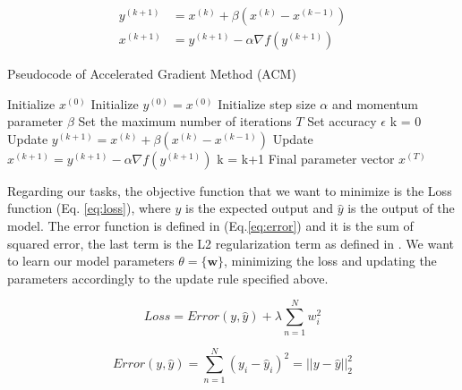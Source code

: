 \begin{equation}
\label{eq:updateruleacm}
\begin{aligned}
y^{(k+1)} &= x^{(k)} + \beta (x^{(k)} - x^{(k-1)}) \\
x^{(k+1)} &= y^{(k+1)} -\alpha \nabla f(y^{(k+1)})    
\end{aligned}
\end{equation}



\begin{algorithm}
    \caption{Pseudocode of Accelerated Gradient Method (ACM)}
    \label{alg:ACG}
    \begin{algorithmic}[1]
        \STATE Initialize $x^{(0)}$ 
        \STATE Initialize $y^{(0)} = x^{(0)}$ 
        \STATE Initialize step size $\alpha$ and  momentum parameter $\beta$
        \STATE Set the maximum number of iterations $T$
        \STATE Set accuracy $\epsilon$
        \STATE k = 0
            \STATE Update $y^{(k+1)} = x^{(k)} + \beta (x^{(k)} - x^{(k-1)}) $ 
            \STATE Update $x^{(k+1)} = y^{(k+1)} -\alpha \nabla f(y^{(k+1)})$ 
            \STATE k = k+1
        \ENDWHILE
    \RETURN Final parameter vector $x^{(T)}$
    \end{algorithmic}
\end{algorithm}

Regarding our tasks, the objective function that we want to minimize is the Loss function (Eq. \ref{eq:loss}), where $y$ is the expected output and $\hat{y}$ is the output of the model. The error function is defined in (Eq.\ref{eq:error}) and it is the sum of squared error, the last term is the L2 regularization term as defined in \cite{ridge_reg}.  We want to learn our model parameters $\theta = \{\textbf{w}\}$, minimizing the loss and updating the parameters accordingly to the update rule specified above. 

\begin{equation}
\label{eq:loss}
Loss = Error(y,\hat{y}) + \lambda \sum_{n=1}^{N} w_i^2
\end{equation}

\begin{equation}
\label{eq:error}
Error(y, \hat{y}) = \sum_{n=1}^{N}(y_i - \hat{y}_i)^2 = || y - \hat{y} ||_2^2
\end{equation}


